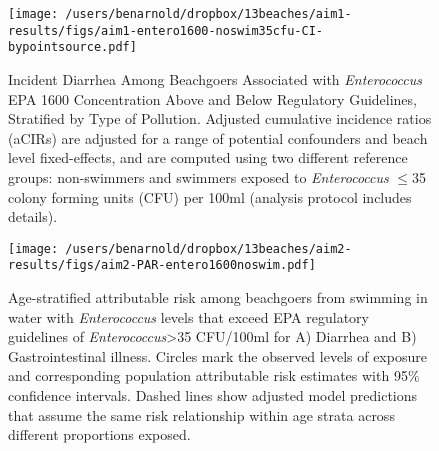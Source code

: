 \documentclass[11pt]{article}
\begin{document}
\begin{figure}[htbp]
\begin{center}
\texttt{[image: /users/benarnold/dropbox/13beaches/aim1-results/figs/aim1-entero1600-noswim35cfu-CI-bypointsource.pdf]} 
\begin{minipage}{0.9\textwidth}
\caption{Incident Diarrhea Among Beachgoers Associated with \textit{Enterococcus} EPA 1600 Concentration Above and Below Regulatory Guidelines, Stratified by Type of Pollution. Adjusted cumulative incidence ratios (aCIRs) are adjusted for a range of potential confounders and beach level fixed-effects, and are computed using two different reference groups: non-swimmers and swimmers exposed to \textit{Enterococcus} $\leq$35 colony forming units (CFU) per 100ml (analysis protocol includes details).}
\label{fig:enteroregulatory}
\end{minipage}
\end{center}
\end{figure}


\begin{figure}[htbp]
\begin{center}
\texttt{[image: /users/benarnold/dropbox/13beaches/aim2-results/figs/aim2-PAR-entero1600noswim.pdf]} 
\begin{minipage}{0.5\textwidth}
\caption{Age-stratified attributable risk among beachgoers from swimming in water with \textit{Enterococcus} levels that exceed EPA regulatory guidelines of \textit{Enterococcus}>35 CFU/100ml for A) Diarrhea and B) Gastrointestinal illness.  Circles mark the observed levels of exposure and corresponding population attributable risk estimates with 95\% confidence intervals. Dashed lines show adjusted model predictions that assume the same risk relationship within age strata across different proportions exposed.}
\label{fig:enteroPAR}
\end{minipage}
\end{center}
\end{figure}
\end{document}
